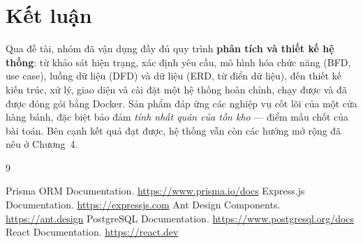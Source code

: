 \documentclass[12pt,a4paper]{report}
\begin{document}
\chapter*{Kết luận}

Qua đề tài, nhóm đã vận dụng đầy đủ quy trình \textbf{phân tích và thiết kế hệ thống}: từ khảo sát hiện trạng, xác định yêu cầu, mô hình hóa chức năng (BFD, use case), luồng dữ liệu (DFD) và dữ liệu (ERD, từ điển dữ liệu), đến thiết kế kiến trúc, xử lý, giao diện và cài đặt một hệ thống hoàn chỉnh, chạy được và đã được đóng gói bằng Docker. Sản phẩm đáp ứng các nghiệp vụ cốt lõi của một cửa hàng bánh, đặc biệt bảo đảm \emph{tính nhất quán của tồn kho} --- điểm mấu chốt của bài toán. Bên cạnh kết quả đạt được, hệ thống vẫn còn các hướng mở rộng đã nêu ở Chương~4.

\begin{thebibliography}{9}
 Prisma ORM Documentation. \url{https://www.prisma.io/docs}
 Express.js Documentation. \url{https://expressjs.com}
 Ant Design Components. \url{https://ant.design}
 PostgreSQL Documentation. \url{https://www.postgresql.org/docs}
 React Documentation. \url{https://react.dev}
\end{thebibliography}
\end{document}
